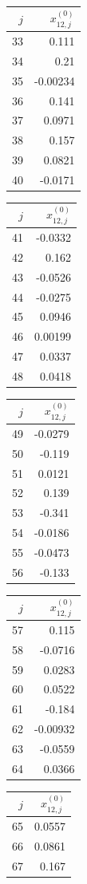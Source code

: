 {\begin{tabular}[t]{r|r}
$j$ & $x^{(0)}_{12,j}$ \\\hline
33 & 0.111 \\
34 & 0.21 \\
35 & -0.00234 \\
36 & 0.141 \\
37 & 0.0971 \\
38 & 0.157 \\
39 & 0.0821 \\
40 & -0.0171
\end{tabular}\kern4pt
\begin{tabular}[t]{r|r}
$j$ & $x^{(0)}_{12,j}$ \\\hline
41 & -0.0332 \\
42 & 0.162 \\
43 & -0.0526 \\
44 & -0.0275 \\
45 & 0.0946 \\
46 & 0.00199 \\
47 & 0.0337 \\
48 & 0.0418
\end{tabular}\kern4pt
\begin{tabular}[t]{r|r}
$j$ & $x^{(0)}_{12,j}$ \\\hline
49 & -0.0279 \\
50 & -0.119 \\
51 & 0.0121 \\
52 & 0.139 \\
53 & -0.341 \\
54 & -0.0186 \\
55 & -0.0473 \\
56 & -0.133
\end{tabular}\kern4pt
\begin{tabular}[t]{r|r}
$j$ & $x^{(0)}_{12,j}$ \\\hline
57 & 0.115 \\
58 & -0.0716 \\
59 & 0.0283 \\
60 & 0.0522 \\
61 & -0.184 \\
62 & -0.00932 \\
63 & -0.0559 \\
64 & 0.0366
\end{tabular}\kern4pt
\begin{tabular}[t]{r|r}
$j$ & $x^{(0)}_{12,j}$ \\\hline
65 & 0.0557 \\
66 & 0.0861 \\
67 & 0.167 \\

\end{tabular}}
